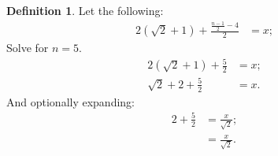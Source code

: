 \documentclass[10pt]{article}
\theoremstyle{plain}
\theoremstyle{definition}
\newtheorem{definition}[theorem]{Definition}
\theoremstyle{remark}
\begin{document}
	\begin{definition}
		Let the following:
		\begin{align*}
			2(\sqrt{2} + 1) + \frac{\frac{n - 1}{2} - 4}{2} &= x;
		\end{align*}
		Solve for $n=5.$
		\begin{align*}
			2(\sqrt{2} + 1) + \frac{5}{2} &= x;\\
			\sqrt{2}+2 + \frac{5}{2} &= x.
		\end{align*}
		And optionally expanding:
		\begin{align*}
			2+\frac{5}{2} &= \frac{x}{\sqrt{2}};\\
			&= \frac{x}{\sqrt{2}}.
		\end{align*}
	\end{definition}
	
	\nocite{*}
	
	
\end{document}
